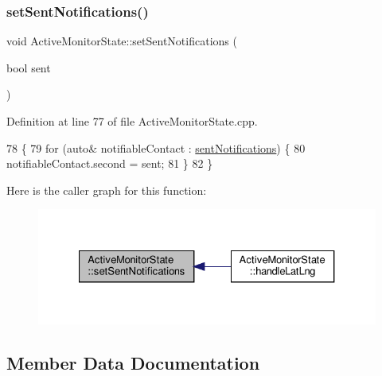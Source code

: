 \mbox{\label{class_active_monitor_state_adedd023d280922991a5dd980017549ec}} 
\subsubsection{\texorpdfstring{set\+Sent\+Notifications()}{setSentNotifications()}}
{\footnotesize\ttfamily void Active\+Monitor\+State\+::set\+Sent\+Notifications (\begin{DoxyParamCaption}\item[{bool}]{sent }\end{DoxyParamCaption})\hspace{0.3cm}{\ttfamily [private]}}



Definition at line 77 of file Active\+Monitor\+State.\+cpp.


\begin{DoxyCode}
78 \{
79     \textcolor{keywordflow}{for} (\textcolor{keyword}{auto}& notifiableContact : \hyperlink{class_active_monitor_state_a25493a87079926faf7d03b8587ad9f62}{sentNotifications}) \{
80         notifiableContact.second = sent;
81     \}
82 \}
\end{DoxyCode}
Here is the caller graph for this function\+:
\nopagebreak
\begin{figure}[H]
\begin{center}
\leavevmode
\includegraphics[width=327pt]{d9/db8/class_active_monitor_state_adedd023d280922991a5dd980017549ec_icgraph}
\end{center}
\end{figure}


\subsection{Member Data Documentation}
\mbox{\label{class_active_monitor_state_af4c93e1be350ea9cf4ac97f97abaf79e}} 
